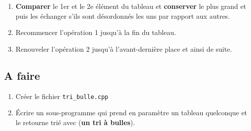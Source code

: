 \documentclass[french]{article}
\begin{document}
\begin{enumerate}
	\item \textbf{Comparer} le 1er et le 2e élément du tableau et \textbf{conserver} le plus grand et puis les échanger s'ils sont désordonnés les uns par rapport aux autres.
	\item Recommencer l'opération 1 jusqu'à la fin du tableau.
	\item Renouveler l'opération 2 jusqu'à l'avant-dernière place et ainsi de suite.
\end{enumerate} 
\subsection*{A faire}
\begin{enumerate}
\item Créer le fichier \texttt{tri\_bulle.cpp}
\item Écrire un sous-programme qui prend en paramètre un tableau quelconque et le retourne trié avec (\textbf{un tri à bulles}).
\end{enumerate}
\end{document}

